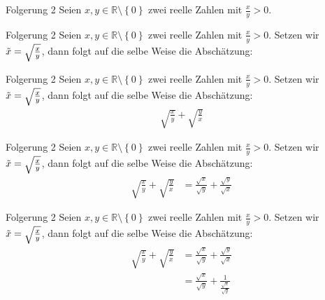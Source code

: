 \documentclass[10pt]{beamer}
\def\bR{\mathbb{R}}
\begin{document}
\begin{frame}{Folgerung 2}
    Seien \( x, y \in \bR \setminus \left\{ 0 \right\} \) zwei reelle Zahlen mit \( \frac{x}{y} > 0 \).
\end{frame}



\begin{frame}{Folgerung 2}
    Seien \( x, y \in \bR \setminus \left\{ 0 \right\} \) zwei reelle Zahlen mit \( \frac{x}{y} > 0 \). Setzen wir \( \Tilde{x} = \sqrt{\frac{x}{y}} \), dann folgt auf die selbe Weise die Abschätzung:
\end{frame}



\begin{frame}{Folgerung 2}
    Seien \( x, y \in \bR \setminus \left\{ 0 \right\} \) zwei reelle Zahlen mit \( \frac{x}{y} > 0 \). Setzen wir \( \Tilde{x} = \sqrt{\frac{x}{y}} \), dann folgt auf die selbe Weise die Abschätzung:
    \begin{align*}
        \sqrt{\frac{x}{y}} + \sqrt{\frac{y}{x}} 
    \end{align*}
\end{frame}



\begin{frame}{Folgerung 2}
    Seien \( x, y \in \bR \setminus \left\{ 0 \right\} \) zwei reelle Zahlen mit \( \frac{x}{y} > 0 \). Setzen wir \( \Tilde{x} = \sqrt{\frac{x}{y}} \), dann folgt auf die selbe Weise die Abschätzung:
    \begin{align*}
        \sqrt{\frac{x}{y}} + \sqrt{\frac{y}{x}} 
        & = \frac{\sqrt{x}}{\sqrt{y}} + \frac{\sqrt{y}}{\sqrt{x}} 
    \end{align*}
\end{frame}



\begin{frame}{Folgerung 2}
    Seien \( x, y \in \bR \setminus \left\{ 0 \right\} \) zwei reelle Zahlen mit \( \frac{x}{y} > 0 \). Setzen wir \( \Tilde{x} = \sqrt{\frac{x}{y}} \), dann folgt auf die selbe Weise die Abschätzung:
    \begin{align*}
        \sqrt{\frac{x}{y}} + \sqrt{\frac{y}{x}} 
        & = \frac{\sqrt{x}}{\sqrt{y}} + \frac{\sqrt{y}}{\sqrt{x}} \\
        & = \frac{\sqrt{x}}{\sqrt{y}} + \frac{1}{\frac{\sqrt{x}}{\sqrt{y}}}
    \end{align*}
\end{frame}
\end{document}
